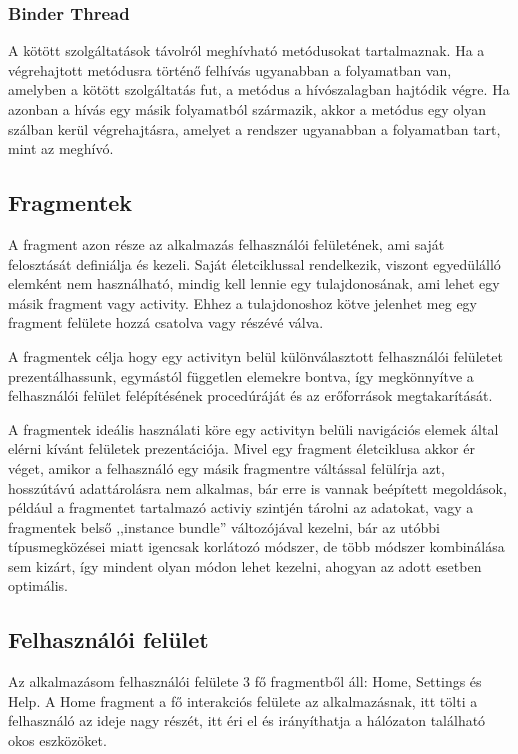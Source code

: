 \documentclass[
]{thesis-ekf}
\theoremstyle{definition}
\theoremstyle{remark}
\begin{document}
\subsubsection{Binder Thread}
A kötött szolgáltatások távolról meghívható metódusokat tartalmaznak. Ha a végrehajtott metódusra történő felhívás ugyanabban a folyamatban van, amelyben a kötött szolgáltatás fut, a metódus a hívószalagban hajtódik végre. Ha azonban a hívás egy másik folyamatból származik, akkor a metódus egy olyan szálban kerül végrehajtásra, amelyet a rendszer ugyanabban a folyamatban tart, mint az meghívó.

\subsection{Fragmentek}
A fragment azon része az alkalmazás felhasználói felületének, ami saját felosztását definiálja és kezeli. Saját életciklussal
rendelkezik, viszont egyedülálló elemként nem használható, mindig kell lennie egy tulajdonosának, ami lehet egy másik
fragment vagy activity. Ehhez a tulajdonoshoz kötve jelenhet meg egy fragment felülete hozzá csatolva vagy részévé válva.

A fragmentek célja hogy egy activityn belül különválasztott felhasználói felületet prezentálhassunk, egymástól független
elemekre bontva, így megkönnyítve a felhasználói felület felépítésének procedúráját és az erőforrások megtakarítását.

A fragmentek ideális használati köre egy activityn belüli navigációs elemek által elérni kívánt felületek prezentációja. Mivel egy fragment életciklusa akkor ér véget, amikor a felhasználó egy másik fragmentre váltással felülírja azt, hosszútávú
adattárolásra nem alkalmas, bár erre is vannak beépített megoldások, például a fragmentet tartalmazó activiy szintjén tárolni
az adatokat, vagy a fragmentek belső ,,instance bundle'' változójával kezelni, bár az utóbbi típusmegközései miatt igencsak
korlátozó módszer, de több módszer kombinálása sem kizárt, így mindent olyan módon lehet kezelni, ahogyan az adott esetben optimális.
\subsection{Felhasználói felület}
Az alkalmazásom felhasználói felülete 3 fő fragmentből áll: Home, Settings és Help. A Home fragment a fő interakciós felülete
az alkalmazásnak, itt tölti a felhasználó az ideje nagy részét, itt éri el és irányíthatja a hálózaton található okos eszközöket.
\end{document}
